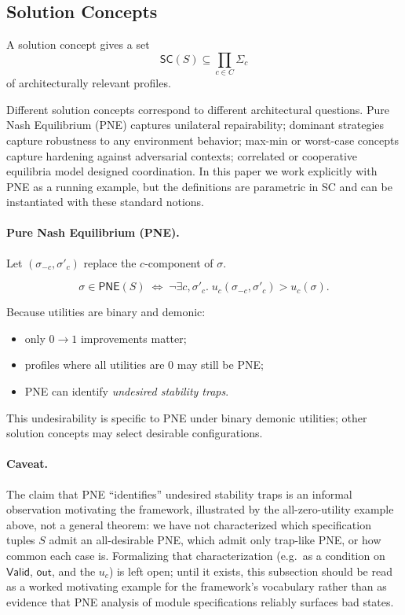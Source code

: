 \subsection{Solution Concepts}

A solution concept gives a set
\[
\mathsf{SC}(S) \subseteq \prod_{c\in C} \Sigma_c
\]
of architecturally relevant profiles.

Different solution concepts correspond to different architectural questions.
Pure Nash Equilibrium (PNE) captures unilateral repairability;
dominant strategies capture robustness to any environment behavior;
max-min or worst-case concepts capture hardening against adversarial contexts;
correlated or cooperative equilibria model designed coordination.
In this paper we work explicitly with PNE as a running example, but the definitions are parametric in SC and can be instantiated with these standard notions.


\paragraph{Pure Nash Equilibrium (PNE).}

Let $(\sigma_{-c}, \sigma'_c)$ replace the $c$-component of $\sigma$.

\[
\sigma \in \mathsf{PNE}(S)
\;\Longleftrightarrow\;
\neg \exists c,\sigma'_c.\;
u_c(\sigma_{-c},\sigma'_c) > u_c(\sigma).
\]

Because utilities are binary and demonic:
\begin{itemize}
\item only $0\to 1$ improvements matter;
\item profiles where all utilities are $0$ may still be PNE;
\item PNE can identify \emph{undesired stability traps}.
\end{itemize}

This undesirability is specific to PNE under binary demonic utilities; other solution concepts may select desirable configurations.

\label{subsec:pne-caveat}
\paragraph{Caveat.} The claim that PNE ``identifies'' undesired stability traps is an informal observation motivating the framework, illustrated by the all-zero-utility example above, not a general theorem: we have not characterized which specification tuples $S$ admit an all-desirable PNE, which admit only trap-like PNE, or how common each case is. Formalizing that characterization (e.g.\ as a condition on $\mathsf{Valid}$, $\mathsf{out}$, and the $u_c$) is left open; until it exists, this subsection should be read as a worked motivating example for the framework's vocabulary rather than as evidence that PNE analysis of module specifications reliably surfaces bad states.

